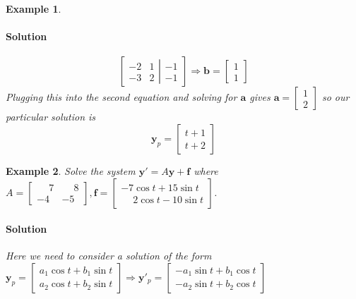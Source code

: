 \documentclass[letterpaper, 11pt, openany]{book}
\theoremstyle{mytheoremstyle}
\theoremstyle{myexamplestyle}
\newtheorem{example}{Example}[section]
\newenvironment{solution}{\paragraph{\sffamily \smaller \fontseries{b}\selectfont Solution}}{\hfill\faSquare}
\begin{document}
\begin{example}
\begin{solution}
        \[\left[
            \begin{matrix}
                -2 & 1\\ -3 & 2
            \end{matrix}
            \left|
                \begin{matrix}
                    -1 \\ -1
                \end{matrix}
            \right.
        \right] \Rightarrow \mathbf{b} = \begin{bmatrix}1 \\ 1\end{bmatrix}
        \]
        Plugging this into the second equation and solving for \(\mathbf{a}\) gives \(\mathbf{a} = \begin{bmatrix}1 \\ 2\end{bmatrix}\)
        so our particular solution is
        \[\mathbf{y}_{p} = \begin{bmatrix}
            t + 1 \\ t + 2
        \end{bmatrix}\]
    \end{solution}
\end{example}

\begin{example}
    Solve the system \(\mathbf{y}' =A\mathbf{y} + \mathbf{f}\) where \(A = \begin{bmatrix}
         \phantom{-}7 &  \phantom{-}8 \\
        -4 & -5
    \end{bmatrix},\mathbf{f} = \begin{bmatrix}-7 \cos t + 15 \sin t \\  \phantom{-}2 \cos t - 10\sin t\end{bmatrix}\).
    \begin{solution}
        Here we need to consider a solution of the form \(\mathbf{y}_p = \begin{bmatrix}
            a_{1} \cos t + b_{1} \sin t\\
            a_{2} \cos t + b_{2} \sin t
        \end{bmatrix} \Rightarrow \mathbf{y}'_{p} = \begin{bmatrix}
            -a_{1} \sin t + b_{1} \cos t\\
            -a_{2} \sin t + b_{2} \cos t
        \end{bmatrix}\)
    \end{solution}
\end{example}
\end{document}

